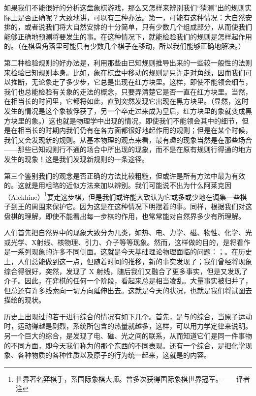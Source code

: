 \documentclass[12pt,oneside]{book}
\begin{document}
\begin{common-format}
如果我们不能很好的分析这盘象棋游戏，那么又怎样来辨别我们“猜测”出的规则实际上是否正确呢？大致地讲，可以有三种办法。第一，可能有这种情况：大自然安排的，或者说我们将大自然安排的十分简单，只有少数几个组成部分，从而使我们能够正确地预测将要发生的事。在这种情况下，就能检验我们的规则是怎样起作用的。（在棋盘角落里可能只有少数几个棋子在移动，所以我们能够正确地解决。）

第二种检验规则的好办法是，利用那些由已知规则推导出来的一些较一般性的法则来检验已知规则本身。比如，象在棋盘中移动的规则是只许走对角线，因而我们可以推断，无论象走了多少步，它总是出现在红方块里。这样，即使不能领会细节，我们也总能检验有关象的走法的概念，只要弄清楚它是否一直在红方块里。当然，在相当长的时间里，它都将如此，直到突然发现它出现在黑方块里。（显然，这时发生的情况是这个象被俘获了，另一个卒走过来成为皇后，红方块里的象就变成黑方块里的象。）这也就是物理学中出现的情况，即使我们不能领会其中的细节，但是在相当长的时期内我们仍有在各方面都很好地起作用的规则；但是在某个时候，我们又会发现新的规则。从基本物理的观点来看，最有趣的现象当然是在那些场合——那些已知规则行不通的场合中所出现的现象，而不是在原有规则行得通的地方发生的现象！这是我们发现新规则的一条途径。

第三个鉴别我们的观念是否正确的方法比较粗糙，但或许是所有方法中最为有效的。这就是用粗略的近似方法来加以辨别。我们可能说不出为什么阿莱克因（Alekhine）\footnote{世界著名弈棋手，系国际象棋大师。曾多次获得国际象棋世界冠军。——译者注}要走这步棋，但是我们或许能大致认为它或多或少地在调集一些棋子到王的周围来保护它。因为这是在这种情况下明摆着的事。同样，根据我们对这盘棋的理解，即使不能看出每一步棋的作用，也常常能对自然界多少有所理解。

人们首先把自然界中的现象大致分为几类，如热、电、力学、磁、物性、化学、光或光学、X射线、核物理、引力、介子等等现象。然而，这样做的目的，是将看作是一系列现象的许多不同侧面。这就是今天基础理论物理面临的问题：；。在历史上，人们总能做到这一点，但随着时间的推移，新的事实发现了；我们曾经将现象综合得很好，突然，发现了 X 射线，随后我们又融合了更多事实，但是又发现了介子。因此，在弈棋的任何一个阶段，看起来总是相当凌乱。大量事实被归并了，但总还有许多线索向一切方向延伸出去。这就是今天的状况，也就是我们将试图去描绘的现状。

历史上出现过的若干进行综合的情况有如下几个。首先，是与的综合，当原子运动时，运动得越是剧烈，系统所包含的热量就越多，这样，可以用力学定律来说明。另一个巨大的综合，是发现了电、磁、光之间的联系，从而知道它们是同一件事物的不同方面，即今天我们称为的那个东西的不同表现。还有一个综合，是把化学现象、各种物质的各种性质以及原子的行为统一起来，这就是的内容。


\end{common-format}
\end{document}

